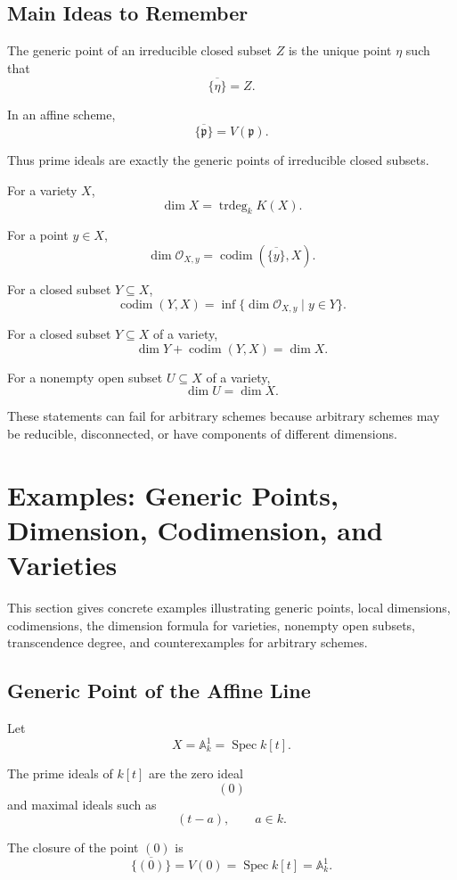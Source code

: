 \documentclass[12pt,a4paper]{article}
\newcommand{\codim}{\operatorname{codim}}
\newcommand{\trdeg}{\operatorname{trdeg}}
\theoremstyle{notespace}
\begin{document}
\subsection{Main Ideas to Remember}

The generic point of an irreducible closed subset \(Z\) is the unique point \(\eta\) such that
\[
\overline{\{\eta\}}=Z.
\]

In an affine scheme,
\[
\overline{\{\mathfrak p\}}=V(\mathfrak p).
\]

Thus prime ideals are exactly the generic points of irreducible closed subsets.

For a variety \(X\),
\[
\dim X=\trdeg_k K(X).
\]

For a point \(y\in X\),
\[
\dim \mathcal O_{X,y}
=
\codim(\overline{\{y\}},X).
\]

For a closed subset \(Y\subseteq X\),
\[
\codim(Y,X)
=
\inf\{\dim \mathcal O_{X,y}\mid y\in Y\}.
\]

For a closed subset \(Y\subseteq X\) of a variety,
\[
\dim Y+\codim(Y,X)=\dim X.
\]

For a nonempty open subset \(U\subseteq X\) of a variety,
\[
\dim U=\dim X.
\]

These statements can fail for arbitrary schemes because arbitrary schemes may be reducible, disconnected, or have components of different dimensions.

\section{Examples: Generic Points, Dimension, Codimension, and Varieties}

This section gives concrete examples illustrating generic points, local dimensions, codimensions, the dimension formula for varieties, nonempty open subsets, transcendence degree, and counterexamples for arbitrary schemes.

\subsection{Generic Point of the Affine Line}

Let
\[
X=\mathbb A^1_k=\operatorname{Spec} k[t].
\]

The prime ideals of \(k[t]\) are the zero ideal
\[
(0)
\]
and maximal ideals such as
\[
(t-a), \qquad a\in k.
\]

The closure of the point \((0)\) is
\[
\overline{\{(0)\}}=V(0)=\operatorname{Spec} k[t]=\mathbb A^1_k.
\]
\end{document}
